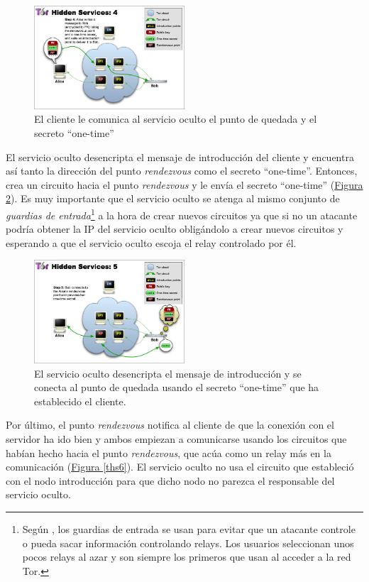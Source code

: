 \documentclass[10pt,a4paper,spanish]{article}
\begin{document}
\begin{figure}[!h]
    \centering
    \includegraphics[width=0.5\textwidth]{THS-4}
    \caption{El cliente le comunica al servicio oculto el punto de quedada y el secreto ``one-time''}
    \label{ths4}
\end{figure}

El servicio oculto desencripta el mensaje de introducción del cliente y encuentra así tanto la dirección del punto \textit{rendezvous} como el secreto ``one-time''. Entonces, crea un circuito hacia el punto \textit{rendezvous} y le envía el secreto ``one-time'' (\hyperref[ths5]{Figura \ref*{ths5}}). Es muy importante que el servicio oculto se atenga al mismo conjunto de \textit{guardias de entrada}\footnote{Según \cite{entryguards}, los guardias de entrada se usan para evitar que un atacante controle o pueda sacar información controlando relays. Los usuarios seleccionan unos pocos relays al azar y son siempre los primeros que usan al acceder a la red Tor.} a la hora de crear nuevos circuitos ya que si no un atacante podría obtener la IP del servicio oculto obligándolo a crear nuevos circuitos y esperando a que el servicio oculto escoja el relay controlado por él.

\begin{figure}[!h]
    \centering
    \includegraphics[width=0.5\textwidth]{THS-5}
    \caption{El servicio oculto desencripta el mensaje de introducción y se conecta al punto de quedada usando el secreto ``one-time'' que ha establecido el cliente.}
    \label{ths5}
\end{figure}

Por último, el punto \textit{rendezvous} notifica al cliente de que la conexión con el servidor ha ido bien y ambos empiezan a comunicarse usando los circuitos que habían hecho hacia el punto \textit{rendezvous}, que acúa como un relay más en la comunicación (\hyperref[ths6]{Figura \ref*{ths6}}). El servicio oculto no usa el circuito que estableció con el nodo introducción para que dicho nodo no parezca el responsable del servicio oculto. 
\end{document}
